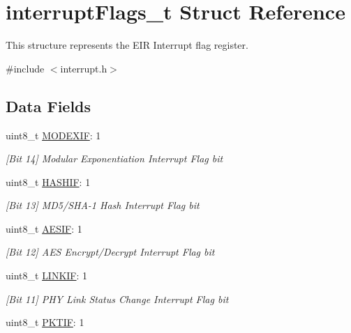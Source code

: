 \hypertarget{structinterrupt_flags__t}{}\section{interrupt\+Flags\+\_\+t Struct Reference}
\label{structinterrupt_flags__t}


This structure represents the E\+IR Interrupt flag register.  




{\ttfamily \#include $<$interrupt.\+h$>$}

\subsection*{Data Fields}
\begin{DoxyCompactItemize}
\item 
uint8\+\_\+t \mbox{\hyperlink{structinterrupt_flags__t_ad01e267d93eace1bc14b2e98c7a6e23b}{M\+O\+D\+E\+X\+IF}}\+: 1
\begin{DoxyCompactList}\small\item\em \mbox{[}Bit 14\mbox{]} Modular Exponentiation Interrupt Flag bit \end{DoxyCompactList}\item 
uint8\+\_\+t \mbox{\hyperlink{structinterrupt_flags__t_a083a2864d9aeecec83f03864835afd68}{H\+A\+S\+H\+IF}}\+: 1
\begin{DoxyCompactList}\small\item\em \mbox{[}Bit 13\mbox{]} M\+D5/\+S\+H\+A-\/1 Hash Interrupt Flag bit \end{DoxyCompactList}\item 
uint8\+\_\+t \mbox{\hyperlink{structinterrupt_flags__t_a710067270606b70dbaf2bbb5aadb5ce9}{A\+E\+S\+IF}}\+: 1
\begin{DoxyCompactList}\small\item\em \mbox{[}Bit 12\mbox{]} A\+ES Encrypt/\+Decrypt Interrupt Flag bit \end{DoxyCompactList}\item 
uint8\+\_\+t \mbox{\hyperlink{structinterrupt_flags__t_a4f301cfd9cfc49b105a5f703947a2298}{L\+I\+N\+K\+IF}}\+: 1
\begin{DoxyCompactList}\small\item\em \mbox{[}Bit 11\mbox{]} P\+HY Link Status Change Interrupt Flag bit \end{DoxyCompactList}\item 
uint8\+\_\+t \mbox{\hyperlink{structinterrupt_flags__t_a4bfff8bb603cb3baf42fabe79d5e0a39}{P\+K\+T\+IF}}\+: 1

\end{DoxyCompactItemize}
